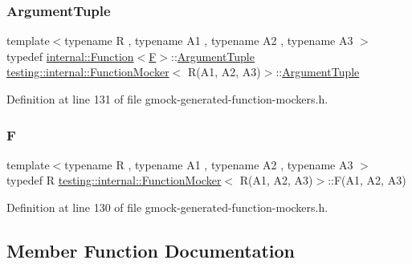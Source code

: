 \subsubsection{\texorpdfstring{Argument\+Tuple}{ArgumentTuple}}
{\footnotesize\ttfamily template$<$typename R , typename A1 , typename A2 , typename A3 $>$ \\
typedef \hyperlink{structtesting_1_1internal_1_1Function}{internal\+::\+Function}$<$\hyperlink{classtesting_1_1internal_1_1FunctionMocker_3_01R_07A1_00_01A2_00_01A3_08_4_a8c471830f963b8012785eb3eeca2cc9c}{F}$>$\+::\hyperlink{classtesting_1_1internal_1_1FunctionMocker_3_01R_07A1_00_01A2_00_01A3_08_4_a347dcf4c054a5f1fbd0e2f0ad1c5e2f3}{Argument\+Tuple} \hyperlink{classtesting_1_1internal_1_1FunctionMocker}{testing\+::internal\+::\+Function\+Mocker}$<$ R(A1, A2, A3)$>$\+::\hyperlink{classtesting_1_1internal_1_1FunctionMocker_3_01R_07A1_00_01A2_00_01A3_08_4_a347dcf4c054a5f1fbd0e2f0ad1c5e2f3}{Argument\+Tuple}}



Definition at line 131 of file gmock-\/generated-\/function-\/mockers.\+h.

\mbox{\label{classtesting_1_1internal_1_1FunctionMocker_3_01R_07A1_00_01A2_00_01A3_08_4_a8c471830f963b8012785eb3eeca2cc9c}} 
\subsubsection{\texorpdfstring{F}{F}}
{\footnotesize\ttfamily template$<$typename R , typename A1 , typename A2 , typename A3 $>$ \\
typedef R \hyperlink{classtesting_1_1internal_1_1FunctionMocker}{testing\+::internal\+::\+Function\+Mocker}$<$ R(A1, A2, A3)$>$\+::F(A1, A2, A3)}



Definition at line 130 of file gmock-\/generated-\/function-\/mockers.\+h.



\subsection{Member Function Documentation}
\mbox{\label{classtesting_1_1internal_1_1FunctionMocker_3_01R_07A1_00_01A2_00_01A3_08_4_a2afad9e39ca64acc6b178fa415907c5b}} 
